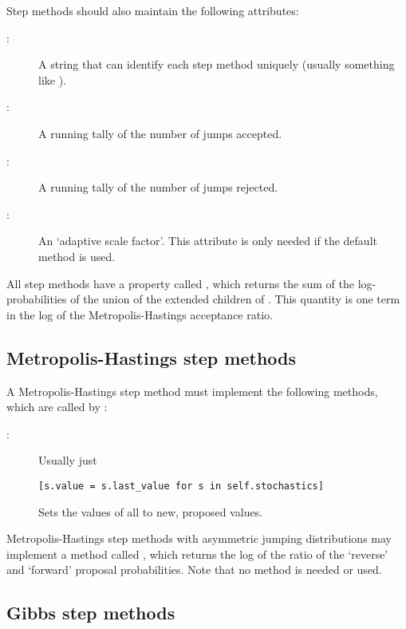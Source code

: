 Step methods should also maintain the following attributes:
\begin{description}
   \item[:] A string that can identify each step method uniquely (usually something like ).
   \item[:] A running tally of the number of jumps accepted.
   \item[:] A running tally of the number of jumps rejected.   
   \item[:] An `adaptive scale factor'. This attribute is only needed if the default  method is used.
\end{description}

All step methods have a property called , which returns the sum of the log-probabilities of the union of the extended children of . This quantity is one term in the log of the Metropolis-Hastings acceptance ratio.


\hypertarget{user-metro}{}
\subsection*{Metropolis-Hastings step methods} \label{user-metro}
A Metropolis-Hastings step method must implement the following methods, which are called by :
\begin{description}

   \item[:] Usually just
   \begin{verbatim}
[s.value = s.last_value for s in self.stochastics]
   \end{verbatim}
   \item[] Sets the values of all  to new, proposed values.
\end{description}
Metropolis-Hastings step methods with asymmetric jumping distributions may implement a method called , which returns the log of the ratio of the `reverse' and `forward' proposal probabilities. Note that no  method is needed or used.

\hypertarget{user-gibbs}{}
\subsection*{Gibbs step methods} \label{user-gibbs}


